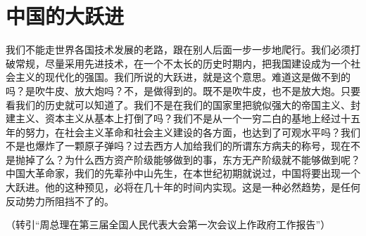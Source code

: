\section[中国的大跃进（一九六四年十二月）]{中国的大跃进}


我们不能走世界各国技术发展的老路，跟在别人后面一步一步地爬行。我们必须打破常规，尽量采用先进技术，在一个不太长的历史时期内，把我国建设成为一个社会主义的现代化的强国。我们所说的大跃进，就是这个意思。难道这是做不到的吗？是吹牛皮、放大炮吗？不，是做得到的。既不是吹牛皮，也不是放大炮。只要看我们的历史就可以知道了。我们不是在我们的国家里把貌似强大的帝国主义、封建主义、资本主义从基本上打倒了吗？我们不是从一个一穷二白的基地上经过十五年的努力，在社会主义革命和社会主义建设的各方面，也达到了可观水平吗？我们不是也爆炸了一颗原子弹吗？过去西方人加给我们的所谓东方病夫的称号，现在不是抛掉了么？为什么西方资产阶级能够做到的事，东方无产阶级就不能够做到呢？中国大革命家，我们的先辈孙中山先生，在本世纪初期就说过，中国将要出现一个大跃进。他的这种预见，必将在几十年的时间内实现。这是一种必然趋势，是任何反动势力所阻挡不了的。

{\raggedleft （转引“周总理在第三届全国人民代表大会第一次会议上作政府工作报告”）\par}


